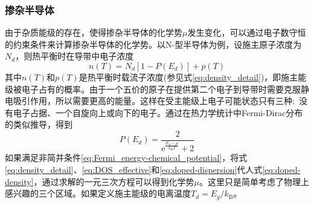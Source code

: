 \subsubsection{掺杂半导体} 
由于杂质能级的存在，使得掺杂半导体的化学势$\mu$发生变化，可以通过电子数守恒的约束条件来计算掺杂半导体的化学势。以N-型半导体为例，设施主原子浓度为$N_d$，则热平衡时在导带中电子浓度
\begin{equation}
	n(T)=N_d[1-P(E_d)]+p(T)
	\label{eq:doped-density}
\end{equation}
其中$n(T)$和$p(T)$是热平衡时载流子浓度(参见式\eqref{eq:density_detail})，即施主能级被电子占有的概率。由于一个五价的原子在提供第二个电子到导带时需要克服静电吸引作用，所以需要更高的能量。这样在受主能级上电子可能状态只有三种:~没有电子占据、一个自旋向上或向下的电子。通过在热力学统计中Fermi-Dirac分布的类似推导，得到
\begin{equation}
	P(E_d)=\dfrac2{\mathrm{e}^{\frac{E_d-\mu}{k_{\mathrm{B}}T}}+2}
	\label{eq:doped-dispersion}
\end{equation}
如果满足非简并条件\eqref{eq:Fermi_energy-chemical_potential}，将式\eqref{eq:density_detail}、\eqref{eq:DOS_effective}和\eqref{eq:doped-dispersion}代人式\eqref{eq:doped-density}，通过求解的一元三次方程可以得到化学势$\mu$。这里只是简单考虑了物理上感兴趣的三个区域。如果定义施主能级的电离温度$T_d=E_g/k_{\mathrm{B}}$。
